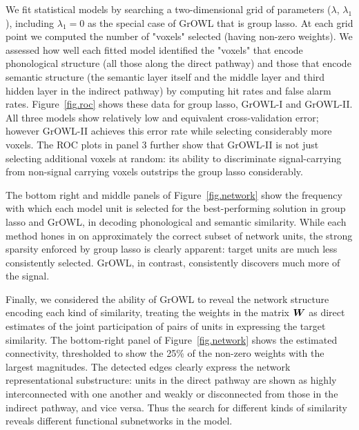 We fit statistical models by searching a two-dimensional grid of parameters
($\lambda$, $\lambda_1$), including $\lambda_1=0$ as the special case of GrOWL that is
group lasso. At each grid point we computed the number of "voxels" selected (\ie having
non-zero weights).  We assessed how well each fitted model identified the "voxels" that
encode phonological structure (all those along the direct pathway) and those that encode
semantic structure (the semantic layer itself and the middle layer and third hidden layer
in the indirect pathway) by computing hit rates and false alarm rates. Figure~\ref{fig.roc}
shows these data for group lasso, GrOWL-I and GrOWL-II. All three models show relatively
low and equivalent cross-validation error; however GrOWL-II achieves this error rate while
selecting considerably more voxels. The ROC plots in panel 3 further show that GrOWL-II is
not just selecting additional voxels at random: its ability to discriminate signal-carrying
from non-signal carrying voxels outstrips the group lasso considerably.

The bottom right and middle panels of Figure~\ref{fig.network} show the frequency with
which each model unit is selected for the best-performing solution in group lasso and
GrOWL, in decoding phonological and semantic similarity. While each method hones in on
approximately the correct subset of network units, the strong sparsity enforced by group
lasso is clearly apparent: target units are much less consistently selected. GrOWL, in
contrast, consistently discovers much more of the signal.

Finally, we considered the ability of GrOWL to reveal the network structure encoding each
kind of similarity, treating the weights in the matrix $\boldsymbol{W}$ as direct estimates of the
joint participation of pairs of units in expressing the target similarity. The bottom-right
panel of Figure~\ref{fig.network} shows the estimated connectivity, thresholded to show the
25\% of the non-zero weights with the largest magnitudes. The detected edges clearly
express the network representational substructure: units in the direct pathway are shown as
highly interconnected with one another and weakly or disconnected from those in the
indirect pathway, and vice versa. Thus the search for different kinds of similarity reveals
different functional subnetworks in the model.


